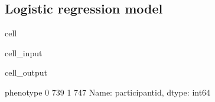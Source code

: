 \documentclass[letterpaper,10pt,english]{jupyterBook}
\begin{document}
\subsection{Logistic regression model}
\label{\detokenize{Cooper:id10}}
\begin{sphinxuseclass}{cell}\begin{sphinxVerbatimInput}

\begin{sphinxuseclass}{cell_input}
\begin{sphinxVerbatim}[commandchars=\\\{\}]
  \PYG{p}{[}\PYG{p}{]}
  \PYG{p}{[}\PYG{p}{[}\PYG{p}{]}\PYG{p}{]}
  \PYG{p}{[}\PYG{p}{]}
     
\PYG{p}{[}\PYG{p}{]}
\end{sphinxVerbatim}

\end{sphinxuseclass}\end{sphinxVerbatimInput}
\begin{sphinxVerbatimOutput}

\begin{sphinxuseclass}{cell_output}
\begin{sphinxVerbatim}[commandchars=\\\{\}]
phenotype
0    739
1    747
Name: participant\PYGZus{}id, dtype: int64
\end{sphinxVerbatim}

\end{sphinxuseclass}\end{sphinxVerbatimOutput}

\end{sphinxuseclass}
\end{document}
